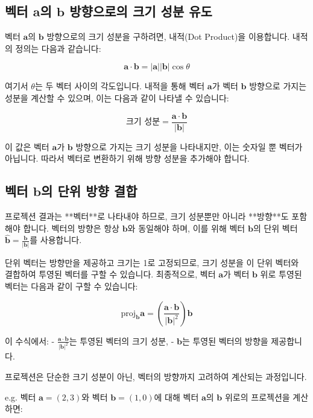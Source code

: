 \documentclass[12pt]{article}
\begin{document}
\subsection{벡터 \( \mathbf{a} \)의 \( \mathbf{b} \) 방향으로의 크기 성분 유도}
\noindent 벡터 \( \mathbf{a} \)의 \( \mathbf{b} \) 방향으로의 크기 성분을 구하려면, 내적(Dot Product)을 이용합니다. 내적의 정의는 다음과 같습니다:

\[
  \mathbf{a} \cdot \mathbf{b} = |\mathbf{a}| |\mathbf{b}| \cos{\theta}
\]

여기서 \( \theta \)는 두 벡터 사이의 각도입니다. 내적을 통해 벡터 \( \mathbf{a} \)가 벡터 \( \mathbf{b} \) 방향으로 가지는 성분을 계산할 수 있으며, 이는 다음과 같이 나타낼 수 있습니다:

\[
  \text{크기 성분} = \frac{\mathbf{a} \cdot \mathbf{b}}{|\mathbf{b}|}
\]

이 값은 벡터 \( \mathbf{a} \)가 \( \mathbf{b} \) 방향으로 가지는 크기 성분을 나타내지만, 이는 숫자일 뿐 벡터가 아닙니다. 따라서 벡터로 변환하기 위해 방향 성분을 추가해야 합니다.

\subsection{벡터 \( \mathbf{b} \)의 단위 방향 결합}
\noindent 프로젝션 결과는 **벡터**로 나타내야 하므로, 크기 성분뿐만 아니라 **방향**도 포함해야 합니다. 벡터의 방향은 항상 \( \mathbf{b} \)와 동일해야 하며, 이를 위해 벡터 \( \mathbf{b} \)의 단위 벡터 \( \hat{\mathbf{b}} = \frac{\mathbf{b}}{|\mathbf{b}|} \)를 사용합니다.

단위 벡터는 방향만을 제공하고 크기는 1로 고정되므로, 크기 성분을 이 단위 벡터와 결합하여 투영된 벡터를 구할 수 있습니다. 최종적으로, 벡터 \( \mathbf{a} \)가 벡터 \( \mathbf{b} \) 위로 투영된 벡터는 다음과 같이 구할 수 있습니다:

\[
  \text{proj}_{\mathbf{b}} \mathbf{a} = \left( \frac{\mathbf{a} \cdot \mathbf{b}}{|\mathbf{b}|^2} \right) \mathbf{b}
\]

이 수식에서:
- \( \frac{\mathbf{a} \cdot \mathbf{b}}{|\mathbf{b}|^2} \)는 투영된 벡터의 크기 성분,
- \( \mathbf{b} \)는 투영된 벡터의 방향을 제공합니다.

\noindent 프로젝션은 단순한 크기 성분이 아닌, 벡터의 방향까지 고려하여 계산되는 과정입니다.

\vspace{1\baselineskip}
\noindent {} e.g. 벡터 \( \mathbf{a} = (2, 3) \)와 벡터 \( \mathbf{b} = (1, 0) \)에 대해 벡터 \( \mathbf{a} \)의 \( \mathbf{b} \) 위로의 프로젝션을 계산하면:
\end{document}
